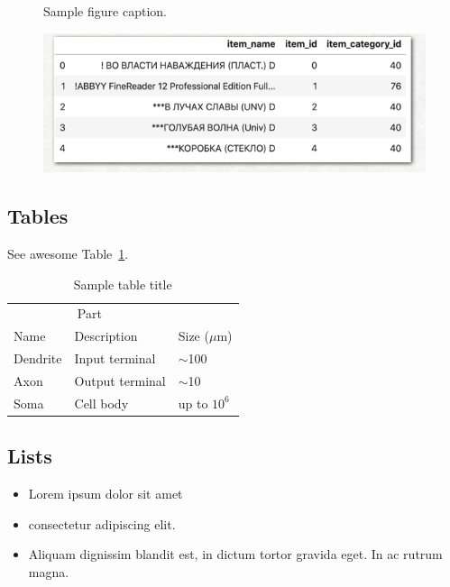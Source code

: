 \documentclass{article}
\begin{document}
\begin{figure}
  \centering
  \fbox{\rule[-.5cm]{4cm}{4cm} \rule[-.5cm]{4cm}{0cm}}
  \caption{Sample figure caption.}
  \label{fig:fig1}
\end{figure}

\begin{figure} %
  \centering
  \includegraphics{test.png}
\end{figure}

\subsection{Tables}
\lipsum[12]
See awesome Table~\ref{tab:table}.

\begin{table}
  \caption{Sample table title}
  \centering
  \begin{tabular}{lll}
    \toprule
    \multicolumn{2}{c}{Part}                   \\
    \cmidrule(r){1-2}
    Name     & Description     & Size ($\mu$m) \\
    \midrule
    Dendrite & Input terminal  & $\sim$100     \\
    Axon     & Output terminal & $\sim$10      \\
    Soma     & Cell body       & up to $10^6$  \\
    \bottomrule
  \end{tabular}
  \label{tab:table}
\end{table}

\subsection{Lists}
\begin{itemize}
  \item Lorem ipsum dolor sit amet
  \item consectetur adipiscing elit.
  \item Aliquam dignissim blandit est, in dictum tortor gravida eget. In ac rutrum magna.
\end{itemize}
\end{document}
